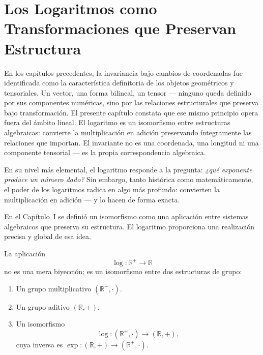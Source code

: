 \chapter{Los Logaritmos como Transformaciones que Preservan Estructura}

En los capítulos precedentes, la invariancia bajo cambios de coordenadas fue
identificada como la característica definitoria de los objetos geométricos y
tensoriales.
Un vector, una forma bilineal, un tensor --- ninguno queda definido por sus
componentes numéricas, sino por las relaciones estructurales que preserva bajo
transformación.
El presente capítulo constata que ese mismo principio opera fuera del ámbito
lineal.
El logaritmo es un isomorfismo entre estructuras algebraicas: convierte la
multiplicación en adición preservando íntegramente las relaciones que importan.
El invariante no es una coordenada, una longitud ni una componente tensorial ---
es la propia correspondencia algebraica.


\medskip

En su nivel más elemental, el logaritmo responde a la pregunta:
\emph{¿qué exponente produce un número dado?}
Sin embargo, tanto histórica como matemáticamente,
el poder de los logaritmos radica en algo más profundo:
convierten la multiplicación en adición --- y lo hacen de forma exacta.

\medskip

En el Capítulo~I se definió un isomorfismo como una aplicación entre sistemas
algebraicos que preserva su estructura.
El logaritmo proporciona una realización precisa y global de esa idea.

\medskip

La aplicación
\[
\log:\mathbb{R}^+\to\mathbb{R}
\]
no es una mera biyección; es un isomorfismo entre dos estructuras de grupo:

\begin{enumerate}
    \item Un grupo multiplicativo $(\mathbb{R}^+,\cdot)$.
    \item Un grupo aditivo $(\mathbb{R},+)$.
    \item Un isomorfismo
    \[
    \log:(\mathbb{R}^+,\cdot)\longrightarrow(\mathbb{R},+),
    \]
    cuya inversa es $\exp:(\mathbb{R},+)\to(\mathbb{R}^+,\cdot)$.
\end{enumerate}

